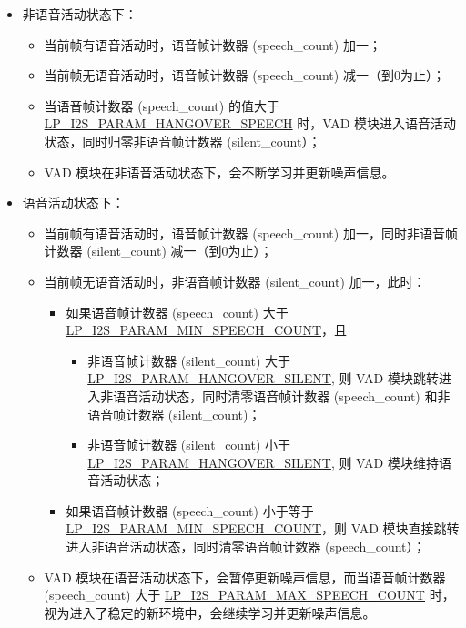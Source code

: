 \documentclass[main\_\_CN.tex]{subfiles}
\begin{document}
\begin{itemize}
    \item 非语音活动状态下：
    \begin{itemize}
        \item 当前帧有语音活动时，语音帧计数器 (speech\_count) 加一；
        \item 当前帧无语音活动时，语音帧计数器 (speech\_count) 减一（到0为止）；
        \item 当语音帧计数器 (speech\_count) 的值大于 \hyperref[fielddesc:LPI2SPARAMHANGOVERSPEECH]{LP\_I2S\_PARAM\_HANGOVER\_SPEECH} 时，VAD 模块进入语音活动状态，同时归零非语音帧计数器 (silent\_count）；
        \item VAD 模块在非语音活动状态下，会不断学习并更新噪声信息。
    \end{itemize}
    \item 语音活动状态下：
    \begin{itemize}
        \item 当前帧有语音活动时，语音帧计数器 (speech\_count) 加一，同时非语音帧计数器 (silent\_count) 减一（到0为止）；
        \item 当前帧无语音活动时，非语音帧计数器 (silent\_count) 加一，此时：
        \begin{itemize}
            \item 如果语音帧计数器 (speech\_count) 大于 \hyperref[fielddesc:LPI2SPARAMMINSPEECHCOUNT]{LP\_I2S\_PARAM\_MIN\_SPEECH\_COUNT}，且
            \begin{itemize}
                \item 非语音帧计数器 (silent\_count) 大于 \hyperref[fielddesc:LPI2SPARAMHANGOVERSILENT]{LP\_I2S\_PARAM\_HANGOVER\_SILENT}, 则 VAD 模块跳转进入非语音活动状态，同时清零语音帧计数器 (speech\_count) 和非语音帧计数器 (silent\_count)；
                \item 非语音帧计数器 (silent\_count) 小于 \hyperref[fielddesc:LPI2SPARAMHANGOVERSILENT]{LP\_I2S\_PARAM\_HANGOVER\_SILENT}, 则 VAD 模块维持语音活动状态；
            \end{itemize}
            \item 如果语音帧计数器 (speech\_count) 小于等于 \hyperref[fielddesc:LPI2SPARAMMINSPEECHCOUNT]{LP\_I2S\_PARAM\_MIN\_SPEECH\_COUNT}，则 VAD 模块直接跳转进入非语音活动状态，同时清零语音帧计数器 (speech\_count）；
        \end{itemize}
        \item VAD 模块在语音活动状态下，会暂停更新噪声信息，而当语音帧计数器 (speech\_count) 大于 \hyperref[fielddesc:LPI2SPARAMMAXSPEECHCOUNT]{LP\_I2S\_PARAM\_MAX\_SPEECH\_COUNT} 时，视为进入了稳定的新环境中，会继续学习并更新噪声信息。
    \end{itemize}
\end{itemize}
\end{document}
